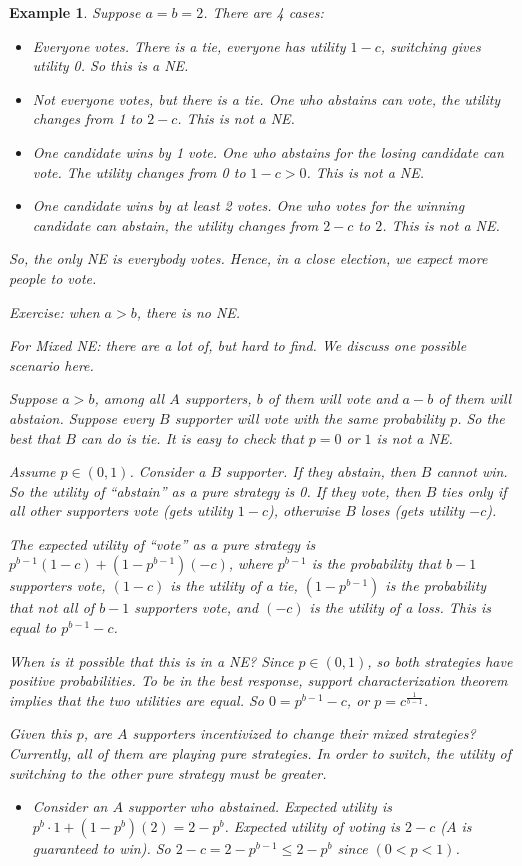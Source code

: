 \documentclass[twoside]{article}
\newtheorem{protoexample}[prototheorem]{Example}
\newenvironment{example}
{\colorlet{shadecolor}{red!15}\begin{shaded}\begin{protoexample}\normalfont}
		{\end{protoexample}\end{shaded}}
\begin{document}
\begin{example}
	Suppose $a= b= 2$. There are 4 cases: \begin{itemize}
	\item Everyone votes. There is a tie, everyone has utility $1-c$, switching gives utility 0. So this is a NE. 
	\item Not everyone votes, but there is a tie. One who abstains can vote, the utility changes from 1 to $2-c$. This is not a NE. 
	\item One candidate wins by 1 vote. One who abstains for the losing candidate can vote. The utility changes from 0 to $1-c > 0$. This is not a NE. 
	\item One candidate wins by at least 2 votes. One who votes for the winning candidate can abstain, the utility changes from $2-c$ to $2$. This is not a NE.
	\end{itemize} 
	So, the only NE is everybody votes. Hence, in a close election, we expect more people to vote. 
	
	Exercise: when $a > b$, there is no NE. 
	
	For Mixed NE: there are a lot of, but hard to find. We discuss one possible scenario here. 
	
	Suppose $a > b$, among all $A$ supporters, $b$ of them will vote and $a-b$ of them will abstaion. Suppose every $B$ supporter will vote with the same probability $p$. So the best that $B$ can do is tie. It is easy to check that $p = 0$ or $1$ is not a NE. 
	
	Assume $p \in (0, 1)$. Consider a $B$ supporter. If they abstain, then $B$ cannot win. So the utility of ``abstain'' as a pure strategy is 0. If they vote, then $B$ ties only if all other supporters vote (gets utility $1-c$), otherwise $B$ loses (gets utility $-c$). 
	
	The expected utility of ``vote'' as a pure strategy is $p^{b-1}(1-c) + (1-p^{b-1})(-c)$, where $p^{b-1}$ is the probability that $b-1$ supporters vote, $(1-c)$ is the utility of a tie, $(1-p^{b-1})$ is the probability that not all of $b-1$ supporters vote, and $(-c)$ is the utility of a loss. This is equal to $p^{b-1} - c$. 
	
	When is it possible that this is in a NE? Since $p \in (0, 1)$, so both strategies have positive probabilities. To be in the best response, support characterization theorem implies that the two utilities are equal. So $0 = p^{b-1} - c$, or $p = c^{\frac{1}{b-1}}$. 
	
	Given this $p$, are $A$ supporters incentivized to change their mixed strategies? Currently, all of them are playing pure strategies. In order to switch, the utility of switching to the other pure strategy must be greater. \begin{itemize}
	\item Consider an $A$ supporter who abstained. Expected utility is $p^b \cdot 1 + (1-p^b)(2) = 2- p^b$. Expected utility of voting is $2-c$ ($A$ is guaranteed to win). So $2-c = 2-p^{b-1} \leq 2-p^b$ since $(0 < p < 1)$. 
		

\end{itemize}
\end{example}
\end{document}
